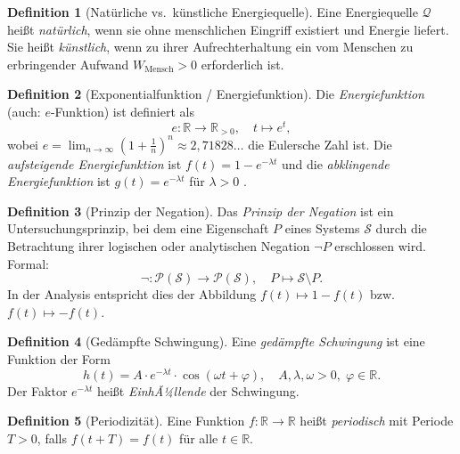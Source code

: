 ﻿\documentclass[a4paper,12pt]{article}
\theoremstyle{definition}
\newtheorem{definition}{Definition}
\begin{document}
\begin{definition}[Nat\"urliche vs.\ k\"unstliche Energiequelle]
    Eine Energiequelle $\mathcal{Q}$ hei\ss{}t \emph{nat\"urlich}, wenn sie ohne
    menschlichen Eingriff existiert und Energie liefert. Sie hei\ss{}t \emph{k\"unstlich},
    wenn zu ihrer Aufrechterhaltung ein vom Menschen zu erbringender Aufwand
    $W_{\mathrm{Mensch}} > 0$ erforderlich ist.
\end{definition}

\begin{definition}[Exponentialfunktion / Energiefunktion]
    Die \emph{Energiefunktion} (auch: $e$-Funktion) ist definiert als
    \[
        e : \mathbb{R} \to \mathbb{R}_{>0},\quad t \mapsto e^t,
    \]
    wobei $e = \lim_{n\to\infty}\left(1+\tfrac{1}{n}\right)^n \approx 2{,}71828\ldots$
    die Eulersche Zahl ist. Die \emph{aufsteigende Energiefunktion} ist
    $f(t) = 1 - e^{-\lambda t}$ und die \emph{abklingende Energiefunktion} ist
    $g(t) = e^{-\lambda t}$ f\"ur $\lambda > 0$ \cite{Abramowitz1972}.
\end{definition}

\begin{definition}[Prinzip der Negation]
    Das \emph{Prinzip der Negation} ist ein Untersuchungsprinzip, bei dem eine
    Eigenschaft $P$ eines Systems $\mathcal{S}$ durch die Betrachtung ihrer logischen
    oder analytischen Negation $\neg P$ erschlossen wird. Formal:
    \[
        \neg : \mathcal{P}(\mathcal{S}) \to \mathcal{P}(\mathcal{S}),\quad
        P \mapsto \mathcal{S} \setminus P.
    \]
    In der Analysis entspricht dies der Abbildung $f(t) \mapsto 1 - f(t)$ bzw.\
    $f(t) \mapsto -f(t)$.
\end{definition}

\begin{definition}[Ged\"ampfte Schwingung]
    Eine \emph{ged\"ampfte Schwingung} ist eine Funktion der Form
    \[
        h(t) = A \cdot e^{-\lambda t} \cdot \cos(\omega t + \varphi),
        \quad A, \lambda, \omega > 0,\; \varphi \in \mathbb{R}.
    \]
    Der Faktor $e^{-\lambda t}$ hei\ss{}t \emph{EinhÃ¼llende} der Schwingung.
\end{definition}

\begin{definition}[Periodizit\"at]
    Eine Funktion $f : \mathbb{R} \to \mathbb{R}$ hei\ss{}t \emph{periodisch} mit
    Periode $T > 0$, falls $f(t + T) = f(t)$ f\"ur alle $t \in \mathbb{R}$.
\end{definition}
\end{document}

